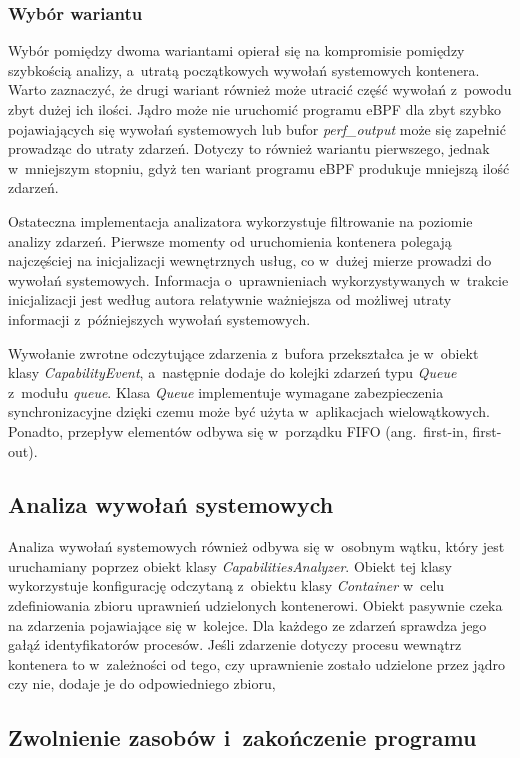 \subsubsection{Wybór wariantu}

Wybór pomiędzy dwoma wariantami opierał się na kompromisie pomiędzy szybkością analizy, a~utratą początkowych wywołań systemowych kontenera. Warto zaznaczyć, że drugi wariant również może utracić część wywołań z~powodu zbyt dużej ich ilości. Jądro może nie uruchomić programu eBPF dla zbyt szybko pojawiających się wywołań systemowych lub bufor \textit{perf_output} może się zapełnić prowadząc do utraty zdarzeń. Dotyczy to również wariantu pierwszego, jednak w~mniejszym stopniu, gdyż ten wariant programu eBPF produkuje mniejszą ilość zdarzeń.

Ostateczna implementacja analizatora wykorzystuje filtrowanie na poziomie analizy zdarzeń. Pierwsze momenty od uruchomienia kontenera polegają najczęściej na inicjalizacji wewnętrznych usług, co w~dużej mierze prowadzi do wywołań systemowych. Informacja o~uprawnieniach wykorzystywanych w~trakcie inicjalizacji jest według autora relatywnie ważniejsza od możliwej utraty informacji z~późniejszych wywołań systemowych.

Wywołanie zwrotne odczytujące zdarzenia z~bufora przekształca je w~obiekt klasy \textit{CapabilityEvent}, a~następnie dodaje do kolejki zdarzeń typu \textit{Queue} z~modułu \textit{queue}. Klasa \textit{Queue} implementuje wymagane zabezpieczenia synchronizacyjne dzięki czemu może być użyta w~aplikacjach wielowątkowych. Ponadto, przepływ elementów odbywa się w~porządku FIFO (ang.~first-in, first-out).

\subsection{Analiza wywołań systemowych}

Analiza wywołań systemowych również odbywa się w~osobnym wątku, który jest uruchamiany poprzez obiekt klasy \textit{CapabilitiesAnalyzer}. Obiekt tej klasy wykorzystuje konfigurację odczytaną z~obiektu klasy \textit{Container} w~celu zdefiniowania zbioru uprawnień udzielonych kontenerowi. Obiekt pasywnie czeka na zdarzenia pojawiające się w~kolejce. Dla każdego ze zdarzeń sprawdza jego gałąź identyfikatorów procesów. Jeśli zdarzenie dotyczy procesu wewnątrz kontenera to w~zależności od tego, czy uprawnienie zostało udzielone przez jądro czy nie, dodaje je do odpowiedniego zbioru, 

\subsection{Zwolnienie zasobów i~zakończenie programu}

